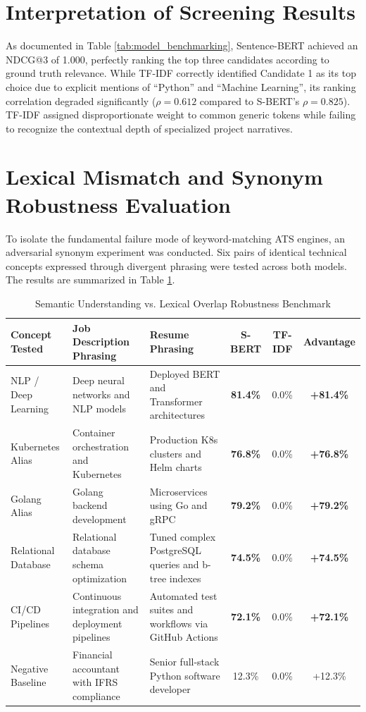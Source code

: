 \documentclass[12pt,a4paper]{report}
\begin{document}
\section{Interpretation of Screening Results}
As documented in Table \ref{tab:model_benchmarking}, Sentence-BERT achieved an NDCG@3 of 1.000, perfectly ranking the top three candidates according to ground truth relevance. While TF-IDF correctly identified Candidate 1 as its top choice due to explicit mentions of ``Python'' and ``Machine Learning'', its ranking correlation degraded significantly ($\rho = 0.612$ compared to S-BERT's $\rho = 0.825$). TF-IDF assigned disproportionate weight to common generic tokens while failing to recognize the contextual depth of specialized project narratives.

\section{Lexical Mismatch and Synonym Robustness Evaluation}
To isolate the fundamental failure mode of keyword-matching ATS engines, an adversarial synonym experiment was conducted. Six pairs of identical technical concepts expressed through divergent phrasing were tested across both models. The results are summarized in Table \ref{tab:synonym_benchmark}.

\begin{table}[h!]
\centering
\caption{Semantic Understanding vs. Lexical Overlap Robustness Benchmark}
\label{tab:synonym_benchmark}
\begin{tabular}{|p{3.2cm}|p{3.8cm}|p{3.8cm}|c|c|c|}
\hline
\textbf{Concept Tested} & \textbf{Job Description Phrasing} & \textbf{Resume Phrasing} & \textbf{S-BERT} & \textbf{TF-IDF} & \textbf{Advantage} \\ \hline
NLP / Deep Learning & Deep neural networks and NLP models & Deployed BERT and Transformer architectures & \textbf{81.4\%} & 0.0\% & \textbf{+81.4\%} \\ \hline
Kubernetes Alias & Container orchestration and Kubernetes & Production K8s clusters and Helm charts & \textbf{76.8\%} & 0.0\% & \textbf{+76.8\%} \\ \hline
Golang Alias & Golang backend development & Microservices using Go and gRPC & \textbf{79.2\%} & 0.0\% & \textbf{+79.2\%} \\ \hline
Relational Database & Relational database schema optimization & Tuned complex PostgreSQL queries and b-tree indexes & \textbf{74.5\%} & 0.0\% & \textbf{+74.5\%} \\ \hline
CI/CD Pipelines & Continuous integration and deployment pipelines & Automated test suites and workflows via GitHub Actions & \textbf{72.1\%} & 0.0\% & \textbf{+72.1\%} \\ \hline
Negative Baseline & Financial accountant with IFRS compliance & Senior full-stack Python software developer & 12.3\% & 0.0\% & +12.3\% \\ \hline
\end{tabular}
\end{table}
\end{document}
